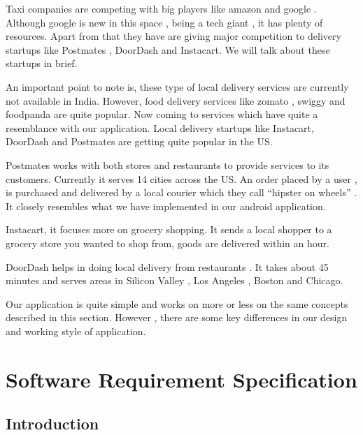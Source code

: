 \documentclass{report}
\begin{document}
\par Taxi companies are competing with big players like amazon and google . Although google is new in this space , being a tech giant , it has plenty of resources. Apart from that they have are giving major competition to delivery startups like Postmates , DoorDash and Instacart. We will talk about these startups in brief.

An important point to note is, these type of local delivery services are currently not available in India. However, food delivery services like zomato , swiggy and foodpanda are quite popular.
Now coming to services which have quite a resemblance with our application.
Local delivery startups like Instacart, DoorDash and  Postmates are getting quite popular in the US.

Postmates works with both stores and restaurants to provide services to its customers. Currently it serves 14 cities across the US. An order placed by a user ,  is purchased and delivered by a local courier which they call “hipster on wheels” . It closely resembles what we have implemented in our android application. 

Instacart, it focuses more on grocery shopping. It sends a local shopper to a grocery store you wanted to shop from, goods are delivered within an hour.

DoorDash helps in doing local delivery from restaurants . It takes about 45 minutes and serves areas in Silicon Valley , Los Angeles , Boston and Chicago.

Our application is quite simple and works on more or less on the same concepts described in this section. However , there are some key differences in our design and working style of application.

\chapter{Software Requirement Specification}
\section{Introduction}
\end{document}
